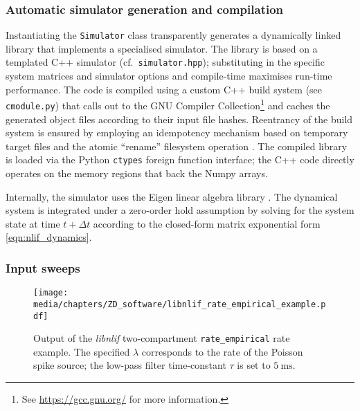 \subsubsection{Automatic simulator generation and compilation}
Instantiating the \texttt{Simulator} class transparently generates a dynamically linked library that implements a specialised simulator.
The library is based on a templated \citep[Chapter~23]{stroustrup2013programming} C++ simulator (cf.~\texttt{simulator.hpp});
substituting in the specific system matrices and simulator options and compile-time maximises run-time performance.
The code is compiled using a custom C++ build system (see \texttt{cmodule.py}) that calls out to the GNU Compiler Collection\footnote{See \url{https://gcc.gnu.org/} for more information.} and caches the generated object files according to their input file hashes.
Reentrancy of the build system is ensured by employing an idempotency mechanism based on temporary target files and the atomic \enquote{rename} filesystem operation \citep[pp.~1816-1820]{2018ieee}.
The compiled library is loaded via the Python \texttt{ctypes} foreign function interface; the C++ code directly operates on the memory regions that back the Numpy arrays.


Internally, the simulator uses the Eigen linear algebra library \citep{eigenweb}.
The dynamical system is integrated under a zero-order hold assumption by solving for the system state at time $t + \Delta t$ according to the closed-form matrix exponential form \cref{eqn:nlif_dynamics}.

\subsubsection{Input sweeps}

\begin{figure}
	\centering
	\texttt{[image: media/chapters/ZD\_software/libnlif\_rate\_empirical\_example.pdf]}
	\caption[Output of the \emph{libnlif} \enquote{rate\_empirical} function for different noise parameters]{Output of the \emph{libnlif} two-compartment \LIF \texttt{rate\_empirical} rate example. The specified $\lambda$ corresponds to the rate of the Poisson spike source; the low-pass filter time-constant $\tau$ is set to $\SI{5}{\milli\second}$.}
	\label{fig:libnlif_rate_empirical_example}
\end{figure}

